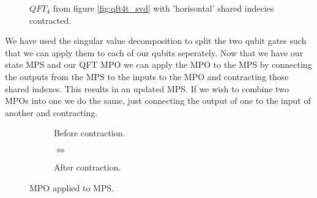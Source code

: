 \begin{figure}[H]
    \centering 
    \caption{$QFT_4$ from figure \ref{fig:qft4t_svd} with 'horisontal' shared indecies contracted.}
    \label{fig:mpo}
\end{figure}
\noindent 
We have used the singular value decomposition to split the two qubit gates such that we can apply them to each of our qubits seperately. 
\noindent
Now that we have our state MPS and our QFT MPO we can apply the MPO to the MPS by connecting the outputs from the MPS to the inputs to the MPO and contracting those shared indexes. This results in an updated MPS. If we wish to combine two MPOs into one we do the same, just connecting the output of one to the input of another and contracting. 

\begin{figure}[H]
    \centering 
    \begin{subfigure}{.3\textwidth}
        \centering
        \caption{Before contraction.}
    \end{subfigure}%
    \begin{subfigure}{.2\textwidth}
      \centering
        $\iff$
        \vspace{5em}
    \end{subfigure}
    \begin{subfigure}{.3\textwidth}
        \hspace{2em}
        \caption{After contraction.}
    \end{subfigure}%
    \caption{MPO applied to MPS.}
    \label{fig:mpo_mps}
\end{figure}

